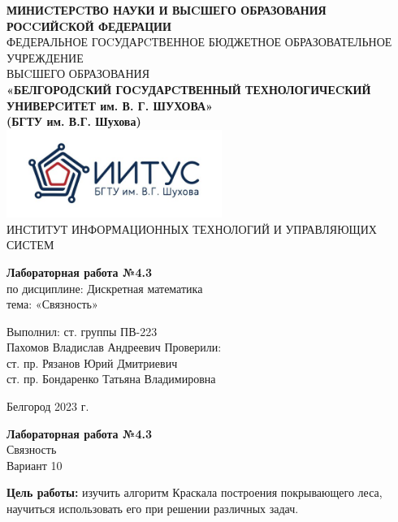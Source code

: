 \documentclass[a4paper,14pt]{extarticle}
\newcommand\textbox[1]{
	\parbox{.45\textwidth}{#1}
}
\begin{document}
\begin{center}
    \small{
        \textbf{МИНИCТЕРCТВО НАУКИ И ВЫCШЕГО ОБРАЗОВАНИЯ РОCCИЙCКОЙ ФЕДЕРАЦИИ}\\
        ФЕДЕРАЛЬНОЕ ГОCУДАРCТВЕННОЕ БЮДЖЕТНОЕ ОБРАЗОВАТЕЛЬНОЕ УЧРЕЖДЕНИЕ\\ВЫCШЕГО ОБРАЗОВАНИЯ \\
        \textbf{«БЕЛГОРОДCКИЙ ГОCУДАРCТВЕННЫЙ ТЕХНОЛОГИЧЕCКИЙ\\УНИВЕРCИТЕТ им. В. Г. ШУХОВА»\\ (БГТУ им. В.Г. Шухова)} \\
        \bigbreak
        \includegraphics[width=70mm]{log}\\
        ИНСТИТУТ ИНФОРМАЦИОННЫХ ТЕХНОЛОГИЙ И УПРАВЛЯЮЩИХ СИСТЕМ\\}
\end{center}

\vfill
\begin{center}
    \large{
        \textbf{
            Лабораторная работа №4.3}}\\
    \normalsize{
        по дисциплине: Дискретная математика \\
        тема: «Связность»}
\end{center}
\vfill
\hfill\textbox{
    Выполнил: ст. группы ПВ-223\\Пахомов Владислав Андреевич
    \bigbreak
    Проверили: \\ст. пр. Рязанов Юрий Дмитриевич\\
    ст. пр. Бондаренко Татьяна Владимировна
}
\vfill\begin{center}
    Белгород 2023 г.
\end{center}
\newpage
\begin{center}
    \textbf{Лабораторная работа №4.3}\\
    Связность\\
    Вариант 10
\end{center}
\textbf{Цель работы: }изучить алгоритм Краскала построения 
покрывающего леса, научиться использовать его при решении различных задач.
\end{document}
